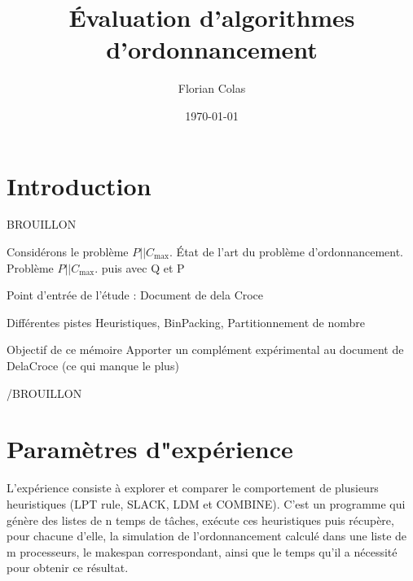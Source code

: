 \documentclass[a4paper,12pt]{report}
\title{Évaluation d'algorithmes d'ordonnancement}
\author{Florian Colas}
\date{\today}
\theoremstyle{plain}				%
\theoremstyle{definition}				%
\newcommand\problemGrahamP{$P||C_{\max}$\xspace}
\begin{document}
\maketitle


%
%
%
\renewcommand{\thesection}{\arabic{section}}
\renewcommand{\contentsname}{Sommaire}
\setcounter{tocdepth}{3}	%
\setcounter{secnumdepth}{3}	%
\tableofcontents

\bigskip
\abstractname{}
\bigskip

\section{Introduction} \label{sec:introduction}

BROUILLON 

Considérons le problème \problemGrahamP. 
État de l'art du problème d’ordonnancement.
Problème \problemGrahamP. 
puis avec Q et P

Point d'entrée de l'étude : Document de dela Croce

Différentes pistes Heuristiques, BinPacking, Partitionnement de nombre

Objectif de ce mémoire 
Apporter un complément expérimental au document de DelaCroce (ce qui manque le plus)

/BROUILLON 


\section{Paramètres d"expérience} \label{sec:Paramètres d"expérience}
L’expérience consiste à explorer et comparer le comportement de plusieurs heuristiques (LPT rule, SLACK, LDM et COMBINE). C'est un programme qui génère des listes de n temps de tâches, exécute ces heuristiques puis récupère, pour chacune d'elle, la simulation de l’ordonnancement calculé dans une liste de m processeurs, le makespan correspondant, ainsi que le temps qu'il a nécessité pour obtenir ce résultat.
\end{document}
